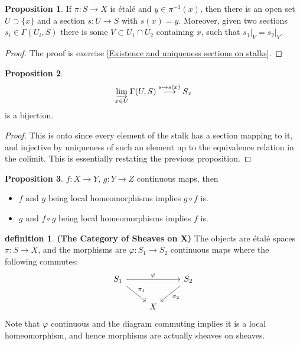 \documentclass[10.5pt]{article}
\theoremstyle{definition}
\newtheorem{proposition}{Proposition}
\newtheorem{definition}{definition}
\newcommand{\set}[1]{\{#1\}}
\newcommand{\tand}{\text{ and }}
\newcommand{\colim}{\varinjlim}
\begin{document}
    \begin{proposition}\label{existence and uniqueness of sections on stalks}
        If \(\pi:S \to X\) is \'etal\'e and \(y \in \pi^{-1}(x)\), then there is an open set \(U \supset \set{x}\) and a section \(s:U \to S\) with \(s(x) = y\). Moreover, given two sections \(s_i \in \Gamma(U_i,S)\) there is some \(V \subset U_1\cap U_2\) containing \(x\), such that \(s_1\vert_V = s_2\vert_V\).
    \end{proposition}
    \begin{proof}
        The proof is exercise \ref{Existence and uniqueness sections on stalks}.
    \end{proof}
    \begin{proposition}
        \begin{align*}
            \colim_{x \in U}\Gamma(U,S) \overset{s \mapsto s(x)}{\longrightarrow} S_x
        \end{align*}
        is a bijection.
    \end{proposition}
    \begin{proof}
        This is onto since every element of the stalk has a section mapping to it, and injective by uniqueness of such an element up to the equivalence relation in the colimit. This is essentially restating the previous proposition.
    \end{proof}
    \begin{proposition}\label{local homeo lemma}
        \(f:X \to Y\), \(g:Y \to Z\) continuous maps, then
        \begin{itemize}
            \item \(f \tand g\) being local homeomorphisms implies \(g \circ f\) is.
            \item \(g \tand f \circ g\) being local homeomorphisms implies \(f\) is.
        \end{itemize}
    \end{proposition}
    \begin{definition}
        \textbf{(The Category of Sheaves on X)} The objects are \'etal\'e spaces \(\pi:S \to X\), and the morphisms are \(\varphi: S_1 \to S_2\) continuous maps where the following commutes:
        \begin{equation*}
            \begin{tikzcd}
                S_1 \arrow[rd,"{\pi_1}"] \arrow[rr,"{\varphi}"] &&S_2 \arrow[ld,"{\pi_2}"] \\
                &X
            \end{tikzcd}
        \end{equation*}
        Note that \(\varphi\) continuous and the diagram commuting implies it is a local homeomorphism, and hence morphisms are actually sheaves on sheaves.
    \end{definition}
\end{document}
